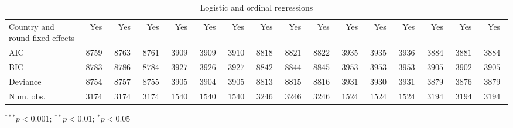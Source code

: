 \begin{table}
\begin{center}
\begin{threeparttable}
\begin{tabular}{l c c c c c c c c c c c c c c c}
\midrule
Country and round fixed effects & Yes           & Yes           & Yes           & Yes           & Yes           & Yes           & Yes           & Yes           & Yes           & Yes           & Yes           & Yes           & Yes           & Yes           & Yes           \\
AIC                             & $87596.70$    & $87634.86$    & $87613.57$    & $39096.35$    & $39092.99$    & $39103.29$    & $88187.86$    & $88213.98$    & $88221.05$    & $39356.40$    & $39355.16$    & $39362.37$    & $38840.85$    & $38816.62$    & $38845.48$    \\
BIC                             & $87830.94$    & $87869.10$    & $87847.81$    & $39272.12$    & $39268.76$    & $39279.06$    & $88422.72$    & $88448.84$    & $88455.91$    & $39531.93$    & $39530.69$    & $39537.90$    & $39050.14$    & $39025.91$    & $39054.77$    \\
Deviance                        & $87540.70$    & $87578.86$    & $87557.57$    & $39050.35$    & $39046.99$    & $39057.29$    & $88131.86$    & $88157.98$    & $88165.05$    & $39310.40$    & $39309.16$    & $39316.37$    & $38790.85$    & $38766.62$    & $38795.48$    \\
Num. obs.                       & $31749$       & $31749$       & $31749$       & $15401$       & $15401$       & $15401$       & $32463$       & $32463$       & $32463$       & $15240$       & $15240$       & $15240$       & $31940$       & $31940$       & $31940$       \\
\bottomrule
\end{tabular}
\begin{tablenotes}[flushleft]
\scriptsize{\item $^{***}p<0.001$; $^{**}p<0.01$; $^{*}p<0.05$}
\end{tablenotes}
\end{threeparttable}
\caption{Logistic and ordinal regressions}
\label{table:coefficients}
\end{center}
\end{table}
